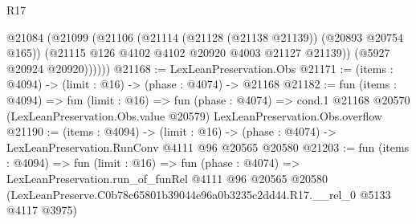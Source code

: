 \begin{lexlean}{R17}
\begin{coremodule}
          @21084
            (@21099
              (@21106
                (@21114 (@21128 (@21138 @21139)) (@20893 @20754 @165))
                (@21115 @126 @4102 @4102 @20920 @4003 @21127 @21139))
              (@5927 @20924 @20920))))))
@21168 := LexLeanPreservation.Obs
@21171 := (items : @4094) -> (limit : @16) -> (phase : @4074) -> @21168
@21182 := fun (items : @4094) =>
  fun (limit : @16) =>
  fun (phase : @4074) =>
  cond.{1} @21168 @20570 (LexLeanPreservation.Obs.value @20579) LexLeanPreservation.Obs.overflow
@21190 := (items : @4094) ->
  (limit : @16) -> (phase : @4074) -> LexLeanPreservation.RunConv @4111 @96 @20565 @20580
@21203 := fun (items : @4094) =>
  fun (limit : @16) =>
  fun (phase : @4074) =>
  LexLeanPreservation.run_of_funRel
    @4111
    @96
    @20565
    @20580
    (LexLeanPreserve.C0b78c65801b39044e96a0b3235c2dd44.R17.__rel_0 @5133 @4117 @3975)
\end{coremodule}
\end{lexlean}
